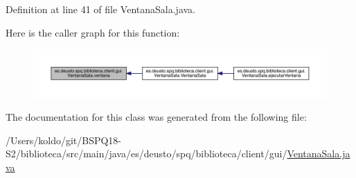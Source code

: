 Definition at line 41 of file Ventana\+Sala.\+java.

Here is the caller graph for this function\+:
\nopagebreak
\begin{figure}[H]
\begin{center}
\leavevmode
\includegraphics[width=350pt]{classes_1_1deusto_1_1spq_1_1biblioteca_1_1client_1_1gui_1_1_ventana_sala_adeb222b4e7905f68619c913a62814a8e_icgraph}
\end{center}
\end{figure}


The documentation for this class was generated from the following file\+:\begin{DoxyCompactItemize}
\item 
/\+Users/koldo/git/\+B\+S\+P\+Q18-\/\+S2/biblioteca/src/main/java/es/deusto/spq/biblioteca/client/gui/\mbox{\hyperlink{_ventana_sala_8java}{Ventana\+Sala.\+java}}\end{DoxyCompactItemize}
